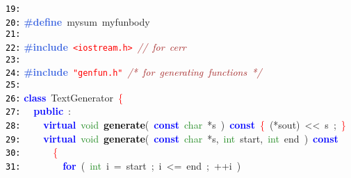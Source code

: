 \documentclass{article}
\begin{document}
\mbox{}\texttt{\textcolor{Black}{19:}}  \\
\mbox{}\texttt{\textcolor{Black}{20:}} \textbf{\textcolor{RoyalBlue}{\#define}}\ \label{test.h:20}mysum\ myfunbody\  \\
\mbox{}\texttt{\textcolor{Black}{21:}}  \\
\mbox{}\texttt{\textcolor{Black}{22:}} \textbf{\textcolor{RoyalBlue}{\#include}}\ \texttt{\textcolor{Red}{\textless{}iostream.h\textgreater{}}}\ \textit{\textcolor{Brown}{//\ for\ cerr}} \\
\mbox{}\texttt{\textcolor{Black}{23:}}  \\
\mbox{}\texttt{\textcolor{Black}{24:}} \textbf{\textcolor{RoyalBlue}{\#include}}\ \texttt{\textcolor{Red}{"{}genfun.h"{}}}\ \textit{\textcolor{Brown}{/*\ for\ generating\ functions\ */}} \\
\mbox{}\texttt{\textcolor{Black}{25:}}  \\
\mbox{}\texttt{\textcolor{Black}{26:}} \textbf{\textcolor{Blue}{class}}\ \textcolor{TealBlue}{\label{test.h:26}TextGenerator}\ \textcolor{Red}{\{} \\
\mbox{}\texttt{\textcolor{Black}{27:}} \ \ \textbf{\textcolor{Blue}{public}}\ \textcolor{BrickRed}{:} \\
\mbox{}\texttt{\textcolor{Black}{28:}} \ \ \ \ \textbf{\textcolor{Blue}{virtual}}\ \textcolor{ForestGreen}{void}\ \textbf{\textcolor{Black}{\label{test.h:28}generate}}\textcolor{BrickRed}{(}\ \textbf{\textcolor{Blue}{const}}\ \textcolor{ForestGreen}{char}\ \textcolor{BrickRed}{*}s\ \textcolor{BrickRed}{)}\ \textbf{\textcolor{Blue}{const}}\ \textcolor{Red}{\{}\ \textcolor{BrickRed}{(*}sout\textcolor{BrickRed}{)}\ \textcolor{BrickRed}{\textless{}\textless{}}\ s\ \textcolor{BrickRed}{;}\ \textcolor{Red}{\}} \\
\mbox{}\texttt{\textcolor{Black}{29:}} \ \ \ \ \textbf{\textcolor{Blue}{virtual}}\ \textcolor{ForestGreen}{void}\ \textbf{\textcolor{Black}{\label{test.h:29}generate}}\textcolor{BrickRed}{(}\ \textbf{\textcolor{Blue}{const}}\ \textcolor{ForestGreen}{char}\ \textcolor{BrickRed}{*}s\textcolor{BrickRed}{,}\ \textcolor{ForestGreen}{int}\ start\textcolor{BrickRed}{,}\ \textcolor{ForestGreen}{int}\ end\ \textcolor{BrickRed}{)}\ \textbf{\textcolor{Blue}{const}}\  \\
\mbox{}\texttt{\textcolor{Black}{30:}} \ \ \ \ \ \ \textcolor{Red}{\{} \\
\mbox{}\texttt{\textcolor{Black}{31:}} \ \ \ \ \ \ \ \ \textbf{\textcolor{Blue}{for}}\ \textcolor{BrickRed}{(}\ \textcolor{ForestGreen}{int}\ i\ \textcolor{BrickRed}{=}\ start\ \textcolor{BrickRed}{;}\ i\ \textcolor{BrickRed}{\textless{}=}\ end\ \textcolor{BrickRed}{;}\ \textcolor{BrickRed}{++}i\ \textcolor{BrickRed}{)} \\
\end{document}
